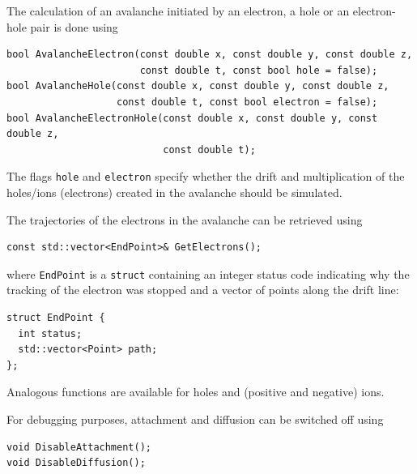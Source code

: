 The calculation of an avalanche initiated by an electron, 
a hole or an electron-hole pair is done using
\begin{lstlisting}
bool AvalancheElectron(const double x, const double y, const double z,
                       const double t, const bool hole = false);
bool AvalancheHole(const double x, const double y, const double z,
                   const double t, const bool electron = false);
bool AvalancheElectronHole(const double x, const double y, const double z, 
                           const double t);
\end{lstlisting}
The flags \texttt{hole} and \texttt{electron} specify whether the  
drift and multiplication of the holes/ions (electrons) created in the 
avalanche should be simulated. 

The trajectories of the electrons in the avalanche can be 
retrieved using
\begin{lstlisting}
const std::vector<EndPoint>& GetElectrons();
\end{lstlisting}
where \texttt{EndPoint} is a \texttt{struct} containing an integer status code indicating why the tracking of the electron was stopped and a vector of points along the drift line:
\begin{lstlisting}
struct EndPoint {
  int status;
  std::vector<Point> path;
};
\end{lstlisting}  
Analogous functions are available for holes and (positive and negative) ions.

For debugging purposes, attachment and diffusion can be switched off using
\begin{lstlisting}
void DisableAttachment();
void DisableDiffusion();
\end{lstlisting}

